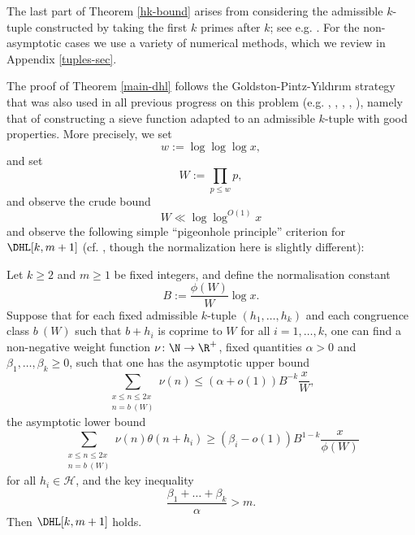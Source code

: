 The last part of Theorem \ref{hk-bound} arises from considering the admissible $k$-tuple constructed by taking the first $k$ primes after $k$; see e.g. \cite[(3.2)]{polymath8a}.  For the non-asymptotic cases we use a variety of numerical methods, which we review in Appendix \ref{tuples-sec}. 

The proof of Theorem \ref{main-dhl} follows the Goldston-Pintz-Y{\i}ld{\i}r{\i}m strategy that was also used in all previous progress on this problem (e.g. \cite{gpy}, \cite{mp}, \cite{zhang}, \cite{polymath8a}, \cite{maynard-new}), namely that of constructing a sieve function adapted to an admissible $k$-tuple with good properties.  More precisely, we set
$$ w := \log \log \log x,$$
and set
$$ W := \prod_{p \leq w} p,$$
and observe the crude bound
\begin{equation}\label{W-bound}
 W \ll \log \log^{O(1)} x
\end{equation}
and observe the following simple ``pigeonhole principle'' criterion for $\DHL[k,m+1]$ (cf. \cite[Lemma 4.1]{polymath8a}, though the normalization here is slightly different):

\begin{lemma}\label{crit} Let $k \geq 2$ and $m \geq 1$ be fixed integers, and define the normalisation constant
\begin{equation}\label{bnorm}
 B := \frac{\phi(W)}{W} \log x.
\end{equation}
Suppose that for each fixed admissible $k$-tuple $(h_1,\dots,h_k)$
  and each congruence class $b\ (W)$ such that $b+h_i$ is coprime to $W$ for all $i=1,\dots,k$, one can find a non-negative weight
  function $\nu \colon \N \to \R^+$, fixed quantities $\alpha > 0$ and $\beta_1,\dots,\beta_k \geq
  0$, such that one has the
  asymptotic upper bound
\begin{equation}\label{s1}
 \sum_{\substack{x \leq n \leq 2x\\ n = b\ (W)}} \nu(n) \leq (\alpha+o(1)) B^{-k} \frac{x}{W},
 \end{equation}
the asymptotic lower bound
\begin{equation}\label{s2}
  \sum_{\substack{x \leq n \leq 2x\\ n = b\ (W)}} \nu(n) \theta(n+h_i) \geq (\beta_i-o(1)) B^{1-k} \frac{x}{\phi(W)}
\end{equation}
for all $h_i \in {\mathcal H}$, and the key inequality
\begin{equation}\label{key}
\frac{\beta_1 + \dots + \beta_k}{\alpha} > m.
\end{equation}
Then $\DHL[k,m+1]$ holds.  
\end{lemma}

